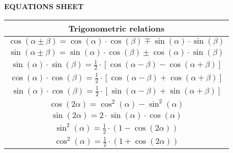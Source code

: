 \documentclass[12pt,es,blanco]{uah}
\begin{document}
\renewcommand{\arraystretch}{1}

\begin{center}

    {\bf EQUATIONS SHEET}
    
    \vspace{0.5cm}

    \renewcommand{\arraystretch}{1.6}
    \begin{tabular}{|c|}
        \multicolumn{1}{c}{{\bf Trigonometric relations}}\\
        \hline 
        $\cos (\alpha \pm \beta) = \cos (\alpha) \cdot \cos (\beta) \mp \sin (\alpha) \cdot \sin (\beta)$ \\
        \hline 
        $\sin (\alpha \pm \beta) = \sin (\alpha) \cdot \cos (\beta) \pm \cos(\alpha) \cdot \sin (\beta)$ \\
        \hline 
        $\sin (\alpha) \cdot \sin (\beta) = \frac{1}{2} \cdot \left [ \cos (\alpha - \beta ) - \cos (\alpha + \beta ) \right ]$ \\ 
        \hline 
        $\cos (\alpha) \cdot \cos (\beta) = \frac{1}{2} \cdot \left [ \cos (\alpha - \beta ) + \cos (\alpha + \beta ) \right ]$ \\
        \hline 
        $\sin (\alpha) \cdot \cos (\beta) = \frac{1}{2} \cdot \left [ \sin (\alpha - \beta ) + \sin (\alpha + \beta ) \right ]$ \\ 
        \hline 
        $\cos (2 \alpha) = \cos^2 (\alpha) - \sin^2 (\alpha)$ \\ 
        \hline 
        $\sin (2 \alpha) = 2 \cdot \sin (\alpha) \cdot \cos (\alpha)$ \\
        \hline 
        $\sin^2 (\alpha) = \frac{1}{2} \cdot \left ( 1 - \cos (2 \alpha) \right )$ \\
        \hline 
        $\cos^2 (\alpha) = \frac{1}{2} \cdot \left ( 1 + \cos (2 \alpha) \right )$ \\
        \hline
    \end{tabular}
    \renewcommand{\arraystretch}{1}
    \vspace{0.5cm}


\end{center}
\end{document}
